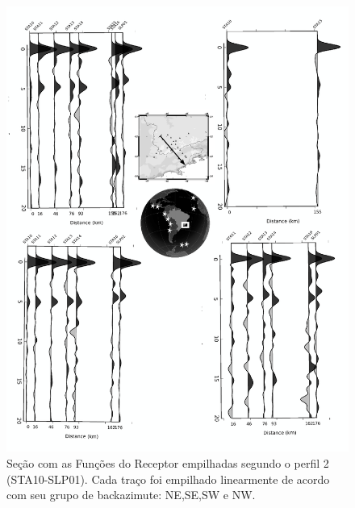 \begin{figure}[!ht]
\centering
\includegraphics[scale=0.15]{Figs/RF_azimute_perfil2.png}
\caption{Seção com as Funções do Receptor empilhadas segundo o perfil 2 (STA10-SLP01). Cada traço foi empilhado linearmente de acordo com seu grupo de backazimute: NE,SE,SW e NW.}
\label{RF_perfil2}
\end{figure}

